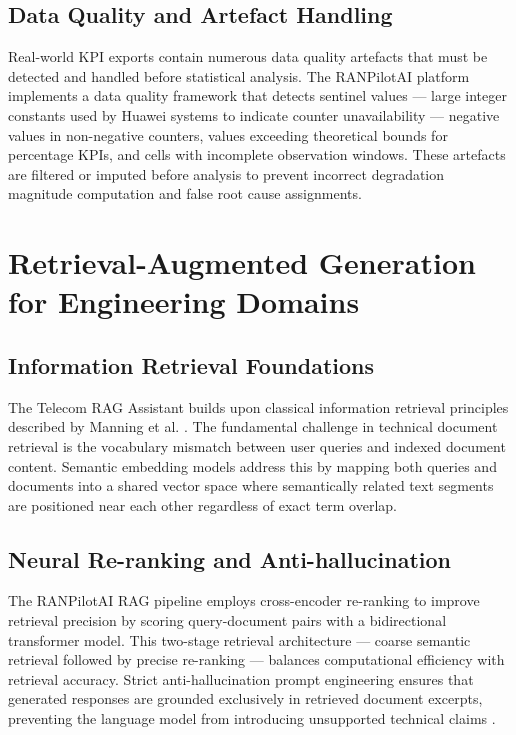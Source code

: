 \subsection{Data Quality and Artefact Handling}

Real-world KPI exports contain numerous data quality artefacts that must be detected and handled before statistical analysis. The RANPilotAI platform implements a data quality framework that detects sentinel values — large integer constants used by Huawei systems to indicate counter unavailability — negative values in non-negative counters, values exceeding theoretical bounds for percentage KPIs, and cells with incomplete observation windows. These artefacts are filtered or imputed before analysis to prevent incorrect degradation magnitude computation and false root cause assignments.

\section{Retrieval-Augmented Generation for Engineering Domains}

\subsection{Information Retrieval Foundations}

The Telecom RAG Assistant builds upon classical information retrieval principles described by Manning et al. \cite{manning2008}. The fundamental challenge in technical document retrieval is the vocabulary mismatch between user queries and indexed document content. Semantic embedding models address this by mapping both queries and documents into a shared vector space where semantically related text segments are positioned near each other regardless of exact term overlap.

\subsection{Neural Re-ranking and Anti-hallucination}

The RANPilotAI RAG pipeline employs cross-encoder re-ranking to improve retrieval precision by scoring query-document pairs with a bidirectional transformer model. This two-stage retrieval architecture — coarse semantic retrieval followed by precise re-ranking — balances computational efficiency with retrieval accuracy. Strict anti-hallucination prompt engineering ensures that generated responses are grounded exclusively in retrieved document excerpts, preventing the language model from introducing unsupported technical claims \cite{jurafsky2023}.

